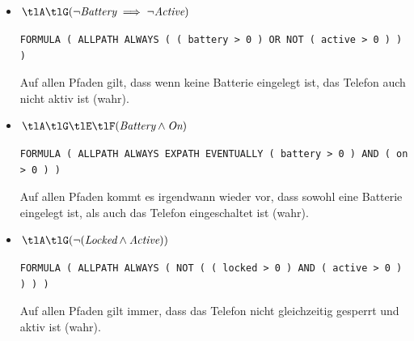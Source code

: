 \documentclass[12pt,a4paper]{../krautsourcing/homework}
\newcommand{\eLocked}{\textit{Locked}}
\newcommand{\eBattery}{\textit{Battery}}
\newcommand{\eOn}{\textit{On}}
\newcommand{\eActive}{\textit{Active}}
\begin{document}
\newpage 
\subsection{}

\begin{itemize}
\item
\(\begin{aligned}
\tlA \tlG ( \lnot \eBattery \implies \lnot \eActive)
\end{aligned}\)
\begin{verbatim}
FORMULA ( ALLPATH ALWAYS ( ( battery > 0 ) OR NOT ( active > 0 ) ) )
\end{verbatim}
Auf allen Pfaden gilt, dass wenn keine Batterie eingelegt ist, das Telefon auch nicht aktiv ist (wahr).
\item
\(\begin{aligned}
\tlA \tlG \tlE \tlF ( \eBattery \land \eOn )
\end{aligned}\)
\begin{verbatim}
FORMULA ( ALLPATH ALWAYS EXPATH EVENTUALLY ( battery > 0 ) AND ( on > 0 ) )
\end{verbatim}
Auf allen Pfaden kommt es irgendwann wieder vor, dass sowohl eine Batterie eingelegt ist, als auch das Telefon eingeschaltet ist (wahr).
\item
\(\begin{aligned}
\tlA \tlG ( \lnot ( \eLocked \land \eActive))
\end{aligned}\)
\begin{verbatim}
FORMULA ( ALLPATH ALWAYS ( NOT ( ( locked > 0 ) AND ( active > 0 ) ) ) )
\end{verbatim}
Auf allen Pfaden gilt immer, dass das Telefon nicht gleichzeitig gesperrt und aktiv ist (wahr).
\end{itemize}

\section{}

\end{document}
